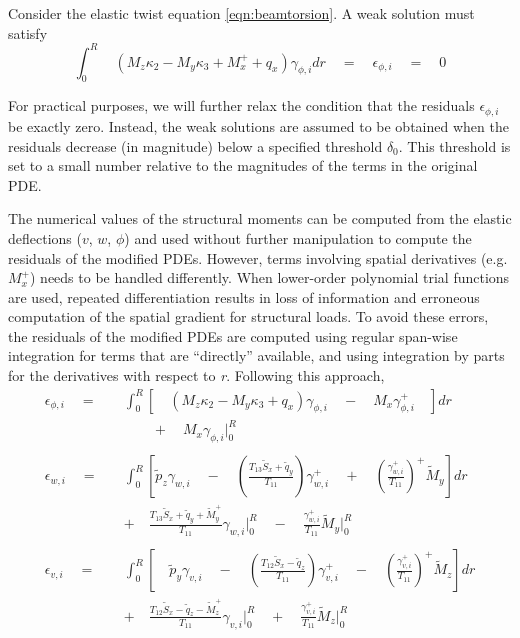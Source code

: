 Consider the elastic twist equation \ref{eqn:beamtorsion}. A weak solution must satisfy 
\begin{equation}
\int_{0}^{R} \quad \left(M_z \kappa_2 - M_y \kappa_3 + M_x^+ + q_x  \right) \gamma_{\phi,i} dr \quad = \quad \epsilon_{\phi,i} \quad = \quad 0
\end{equation}

For practical purposes, we will further relax the condition that the residuals $\epsilon_{\phi,i}$ be exactly zero. Instead, the weak solutions are assumed to be obtained when the residuals decrease (in magnitude) below a specified threshold $\delta_0$. This threshold is set to a small number relative to the magnitudes of the terms in the original PDE. 

The numerical values of the structural moments can be computed from the elastic deflections ($v$, $w$, $\phi$) and used without further manipulation to compute the residuals of the modified PDEs. However, terms involving spatial derivatives (e.g. $M_x^+$) needs to be handled differently. When lower-order polynomial trial functions are used, repeated differentiation results in loss of information and erroneous computation of the spatial gradient for structural loads. To avoid these errors, the residuals of the modified PDEs are computed using regular span-wise integration for terms that are ``directly'' available, and using integration by parts for the derivatives with respect to \emph{r}. Following this approach,
\begin{align*}
\epsilon_{\phi,i} \quad = \quad &\int_{0}^{R} \left[\quad \left(M_z \kappa_2 - M_y \kappa_3 +q_x  \right) \gamma_{\phi,i} \quad - \quad M_x \gamma_{\phi,i}^+ \quad\right] dr \\
& \qquad + \quad M_x \gamma_{\phi,i}\biggr\rvert_{0}^{R} \\
\quad &\\
\epsilon_{w,i} \quad = \quad & \int_{0}^{R} \left[ \tilde{p}_z \gamma_{w,i} \quad - \quad \left(\frac{T_{13} \widetilde{S}_x + \tilde{q}_y}{T_{11}}\right) \gamma_{w,i}^+ \quad + \quad \left(\frac{\gamma_{w,i}^+}{T_{11}}\right)^+ \widetilde{M}_y \right] dr \\ 
& +\quad \frac{T_{13}\widetilde{S}_x + \tilde{q}_y+ \widetilde{M}_y^+}{T_{11}} \gamma_{w,i}\biggr\rvert_{0}^{R} \quad - \quad \frac{\gamma_{w,i}^+}{T_{11}} \widetilde{M}_y \biggr\rvert_{0}^{R} \\
\quad & \\
\epsilon_{v,i} \quad = \quad & \int_{0}^{R} \left[\quad \tilde{p}_y \gamma_{v,i} \quad - \quad \left(\frac{T_{12} \widetilde{S}_x - \tilde{q}_z}{T_{11}}\right)\gamma_{v,i}^+ \quad - \quad \left(\frac{\gamma_{v,i}^+}{T_{11}}\right)^+ \widetilde{M}_z \right] dr \\ 
&+\quad \frac{T_{12}\widetilde{S}_x - \tilde{q}_z - \widetilde{M}_z^+}{T_{11}}  \gamma_{v,i}\biggr\rvert_{0}^{R} \quad + \quad \frac{\gamma_{v,i}^+}{T_{11}} \widetilde{M}_z \biggr\rvert_{0}^{R} 
\end{align*}
